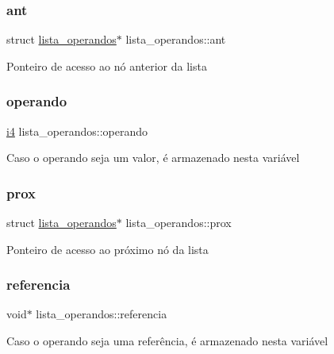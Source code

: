 \subsubsection{\texorpdfstring{ant}{ant}}
{\footnotesize\ttfamily struct \hyperlink{structlista__operandos}{lista\+\_\+operandos}$\ast$ lista\+\_\+operandos\+::ant}

Ponteiro de acesso ao nó anterior da lista \mbox{\label{structlista__operandos_ab978dbacb8f42fd87f19cca8e804d121}} 
\subsubsection{\texorpdfstring{operando}{operando}}
{\footnotesize\ttfamily \hyperlink{lista__operandos_8h_a7bc084923d20fddbe46335d882c6fda2}{i4} lista\+\_\+operandos\+::operando}

Caso o operando seja um valor, é armazenado nesta variável \mbox{\label{structlista__operandos_a90699e5c7f710177b37754cd5231c9f5}} 
\subsubsection{\texorpdfstring{prox}{prox}}
{\footnotesize\ttfamily struct \hyperlink{structlista__operandos}{lista\+\_\+operandos}$\ast$ lista\+\_\+operandos\+::prox}

Ponteiro de acesso ao próximo nó da lista \mbox{\label{structlista__operandos_a5efba56f9f00715a8c9558292b851d37}} 
\subsubsection{\texorpdfstring{referencia}{referencia}}
{\footnotesize\ttfamily void$\ast$ lista\+\_\+operandos\+::referencia}

Caso o operando seja uma referência, é armazenado nesta variável \mbox{\label{structlista__operandos_af64bc84846f21a809f68b783f0e39f40}} 
